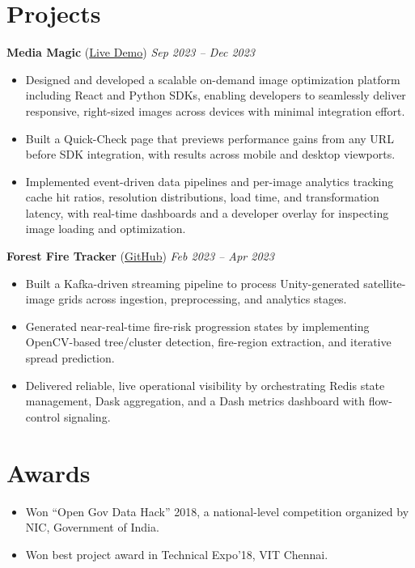 \documentclass[10pt]{article}
\begin{document}
\section*{Projects}
\textbf{Media Magic} (\href{https://media-magic.umangshah.me}{Live Demo}) \hfill \textit{Sep 2023 -- Dec 2023} \\
\vspace{0pt}
\begin{itemize}
  \item Designed and developed a scalable on-demand image optimization platform including React and Python SDKs, enabling developers to seamlessly deliver responsive, right-sized images across devices with minimal integration effort.
  \item Built a Quick-Check page that previews performance gains from any URL before SDK integration, with results across mobile and desktop viewports.
  \item Implemented event-driven data pipelines and per-image analytics tracking cache hit ratios, resolution distributions, load time, and transformation latency, with real-time dashboards and a developer overlay for inspecting image loading and optimization.
\end{itemize}

\textbf{Forest Fire Tracker} (\href{https://github.com/umangshah-js/forest-fire-tracker}{GitHub}) \hfill \textit{Feb 2023 -- Apr 2023} \\
\vspace{0pt}
\begin{itemize}
  \item Built a Kafka-driven streaming pipeline to process Unity-generated satellite-image grids across ingestion, preprocessing, and analytics stages.
  \item Generated near-real-time fire-risk progression states by implementing OpenCV-based tree/cluster detection, fire-region extraction, and iterative spread prediction.
  \item Delivered reliable, live operational visibility by orchestrating Redis state management, Dask aggregation, and a Dash metrics dashboard with flow-control signaling.
\end{itemize}

\vspace{0pt}

\section*{Awards}
\begin{itemize}
  \item Won ``Open Gov Data Hack'' 2018, a national-level competition organized by NIC, Government of India.
  \item Won best project award in Technical Expo'18, VIT Chennai.
\end{itemize}
\end{document}
